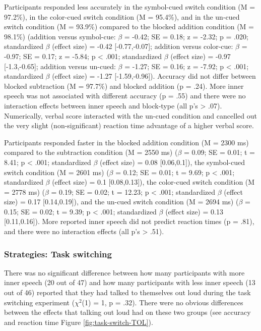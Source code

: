 \documentclass[
  man,a4paper,floatsintext]{apa6}
\begin{document}
Participants responded less accurately in the symbol-cued switch condition (M = 97.2\%), in the color-cued switch condition (M = 95.4\%), and in the un-cued switch condition (M = 93.9\%) compared to the blocked addition condition (M = 98.1\%) (addition versus symbol-cue: \(\beta\) = -0.42; SE = 0.18; z = -2.32; p = .020; standardized \(\beta\) (effect size) = -0.42 {[}-0.77,-0.07{]}; addition versus color-cue: \(\beta\) = -0.97; SE = 0.17; z = -5.84; p \textless{} .001; standardized \(\beta\) (effect size) = -0.97 {[}-1.3,-0.65{]}; addition versus un-cued: \(\beta\) = -1.27; SE = 0.16; z = -7.92; p \textless{} .001; standardized \(\beta\) (effect size) = -1.27 {[}-1.59,-0.96{]}). Accuracy did not differ between blocked subtraction (M = 97.7\%) and blocked addition (p = .24). More inner speech was not associated with different accuracy (p = .55) and there were no interaction effects between inner speech and block-type (all p's \textgreater{} .07). Numerically, verbal score interacted with the un-cued condition and cancelled out the very slight (non-significant) reaction time advantage of a higher verbal score.

Participants responded faster in the blocked addition condition (M = 2300 ms) compared to the subtraction condition (M = 2550 ms) (\(\beta\) = 0.09; SE = 0.01; t = 8.41; p \textless{} .001; standardized \(\beta\) (effect size) = 0.08 {[}0.06,0.1{]}), the symbol-cued switch condition (M = 2601 ms) (\(\beta\) = 0.12; SE = 0.01; t = 9.69; p \textless{} .001; standardized \(\beta\) (effect size) = 0.1 {[}0.08,0.13{]}), the color-cued switch condition (M = 2778 ms) (\(\beta\) = 0.19; SE = 0.02; t = 12.23; p \textless{} .001; standardized \(\beta\) (effect size) = 0.17 {[}0.14,0.19{]}), and the un-cued switch condition (M = 2694 ms) (\(\beta\) = 0.15; SE = 0.02; t = 9.39; p \textless{} .001; standardized \(\beta\) (effect size) = 0.13 {[}0.11,0.16{]}). More reported inner speech did not predict reaction times (p = .81), and there were no interaction effects (all p's \textgreater{} .51).

\hypertarget{strategies-task-switching}{%
\subsubsection{Strategies: Task switching}\label{strategies-task-switching}}

There was no significant difference between how many participants with more inner speech (20 out of 47) and how many participants with less inner speech (13 out of 46) reported that they had talked to themselves out loud during the task switching experiment (\(\chi^2\)(1) = 1, p = .32). There were no obvious differences between the effects that talking out loud had on these two groups (see accuracy and reaction time Figure \ref{fig:task-switch-TOL}).
\end{document}
